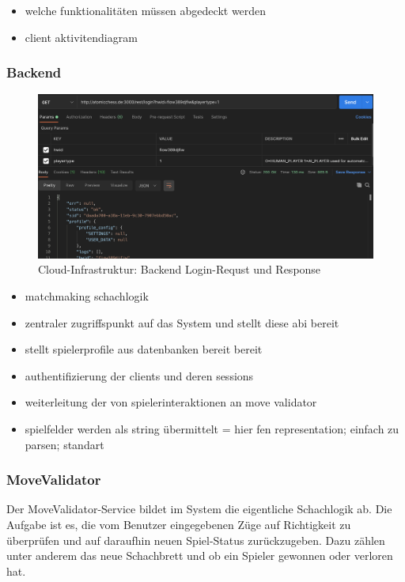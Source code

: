 \begin{itemize}
\tightlist
\item
  welche funktionalitäten müssen abgedeckt werden
\item
  client aktivitendiagram
\end{itemize}

\hypertarget{backend}{%
\subsubsection{Backend}\label{backend}}

\begin{figure}
\centering
\includegraphics{images/ATC_request_example.png}
\caption{Cloud-Infrastruktur: Backend Login-Requst und Response}
\end{figure}

\begin{itemize}
\tightlist
\item
  matchmaking schachlogik
\item
  zentraler zugriffspunkt auf das System und stellt diese abi bereit
\item
  stellt spielerprofile aus datenbanken bereit bereit
\item
  authentifizierung der clients und deren sessions
\item
  weiterleitung der von spielerinteraktionen an move validator
\item
  spielfelder werden als string übermittelt = hier fen representation;
  einfach zu parsen; standart
\end{itemize}

\hypertarget{movevalidator}{%
\subsubsection{MoveValidator}\label{movevalidator}}

Der MoveValidator-Service bildet im System die eigentliche Schachlogik
ab. Die Aufgabe ist es, die vom Benutzer eingegebenen Züge auf
Richtigkeit zu überprüfen und auf daraufhin neuen Spiel-Status
zurückzugeben. Dazu zählen unter anderem das neue Schachbrett und ob ein
Spieler gewonnen oder verloren hat.

